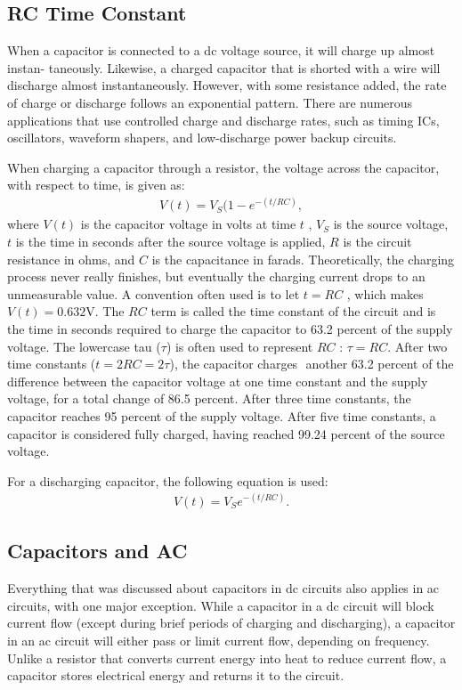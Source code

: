 \documentclass[../../document]{subfiles}
\begin{document}
\subsection{RC Time Constant}
When a capacitor is connected to a dc voltage source, it will charge up almost
instan- taneously. Likewise, a charged capacitor that is shorted with a wire
will discharge almost instantaneously. However, with some resistance added, the
rate of charge or discharge follows an exponential pattern. There are numerous
applications that use controlled charge and discharge rates, such as timing
ICs, oscillators, waveform shapers, and low-discharge power backup
circuits. \cite{practical_electronics}

When charging a capacitor through a resistor, the voltage across the capacitor,
with respect to time, is given as:
\begin{gather}
	V(t) = V_S (1 - e^{-(t/RC)}, \tag{Charging RC}
\end{gather}
where \(V(t)\) is the capacitor voltage in volts at time \(t\) , \(V_S\) is the
source voltage, \(t\) is the time in seconds after the source voltage is
applied, \(R\)  is the circuit resistance in ohms, and \(C\) is the capacitance
in farads. Theoretically, the charging process never really finishes, but
eventually the charging current drops to an unmeasurable value. A convention
often used is to let \(t = RC\) , which makes \( V(t) = 0.632\unit{\volt}\).
The \(RC\) term is called the time constant of the circuit and is the time in
seconds required to charge the capacitor to 63.2 percent of the supply voltage.
The lowercase tau (\(\tau\)) is often used to represent \(RC\) : \(\tau = RC\).
After two time constants (\(t = 2RC = 2\tau\)), the capacitor charges ­ another
63.2 percent of the difference between the capacitor voltage at one time
constant and the supply voltage, for a total change of 86.5 percent. After
three time constants, the capacitor reaches 95 percent of the supply voltage.
After five time constants, a capacitor is considered fully charged, having
reached 99.24 percent of the source voltage. \cite{practical_electronics}

For a discharging capacitor, the following equation is used:
\cite{practical_electronics}
\begin{gather}
	V(t) = V_S e^{-(t/RC)}. \tag{Discharging RC}
\end{gather}


\subsection{Capacitors and AC}
Everything that was discussed about capacitors in dc circuits also applies in
ac circuits, with one major exception. While a capacitor in a dc circuit will
block current flow (except during brief periods of charging and discharging), a
capacitor in an ac circuit will either pass or limit current flow, depending on
frequency. Unlike a resistor that converts current energy into heat to reduce
current flow, a capacitor stores electrical energy and returns it to the
circuit. \cite{practical_electronics}
\end{document}
